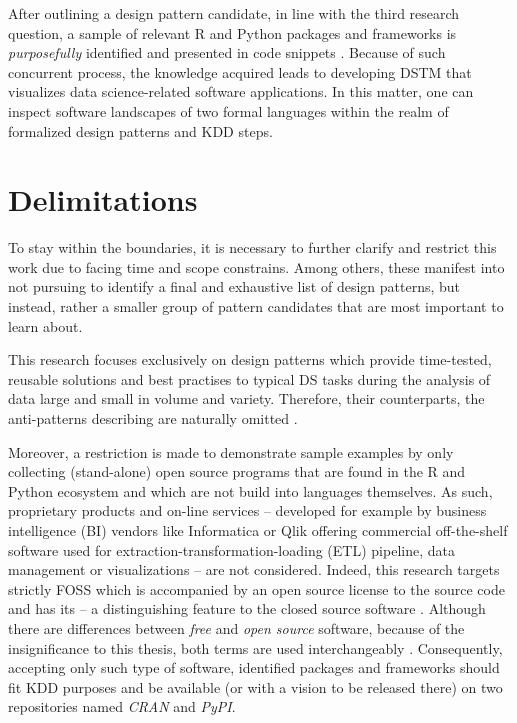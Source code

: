 After outlining a design pattern candidate, in line with the third research question, a sample of relevant R and Python packages and frameworks is \emph{purposefully} identified and presented in code snippets \parencites{JansenHarrie2010}{PattonMQ1990}{Trochim2006}.
Because of such concurrent process, the knowledge acquired leads to developing \ac{DSTM} that visualizes data science-related software applications.
In this matter, one can inspect software landscapes of two formal languages within the realm of formalized design patterns and \ac{KDD} steps.

\section{Delimitations}
\label{delimitations}
To stay within the boundaries, it is necessary to further clarify and restrict this work due to facing time and scope constrains.
Among others, these manifest into not pursuing to identify a final and exhaustive list of design patterns, but instead, rather a smaller group of pattern candidates that are most important to learn about. 

This research focuses exclusively on design patterns which provide time-tested, reusable solutions and best practises to typical \ac{DS} tasks during the analysis of data large and small in volume and variety. 
Therefore, their counterparts, the anti-patterns describing  are naturally omitted \parencite[59]{DeardenHCI2006}.

Moreover, a restriction is made to demonstrate sample examples by only collecting (stand-alone) open source programs that are found in the R and Python ecosystem and which are not build into languages themselves.
As such, proprietary products and on-line services -- developed for example by business intelligence (\ac{BI}) vendors like Informatica or Qlik offering commercial off-the-shelf software used for extraction-transformation-loading (\ac{ETL}) pipeline, data management or visualizations -- are not considered.
Indeed, this research targets strictly \ac{FOSS} which is accompanied by an open source license to the source code and has its  -- a distinguishing feature to the closed source software \parencite[1]{PetrovAarhus16}.
Although there are differences between \emph{free} and \emph{open source} software, because of the insignificance to this thesis, both terms are used interchangeably \parencite{PetrovAarhus16}. 
Consequently, accepting only such type of software, identified packages and frameworks should fit \ac{KDD} purposes and be available (or with a vision to be released there) on two repositories named \emph{\ac{CRAN}} and \emph{\ac{PyPI}}.

